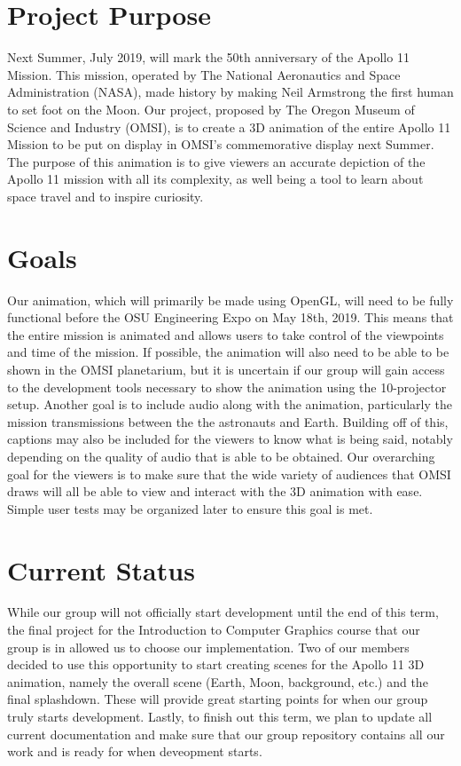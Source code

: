 \documentclass[onecolumn, draftclsnofoot,10pt, compsoc]{IEEEtran}
\begin{document}
\clearpage


\section{Project Purpose}
Next Summer, July 2019, will mark the 50th anniversary of the Apollo 11 Mission. This mission, operated by The National Aeronautics and Space Administration (NASA), made history by making Neil Armstrong the first human to set foot on the Moon. Our project, proposed by The Oregon Museum of Science and Industry (OMSI), is to create a 3D animation of the entire Apollo 11 Mission to be put on display in OMSI's commemorative display next Summer. The purpose of this animation is to give viewers an accurate depiction of the Apollo 11 mission with all its complexity, as well being a tool to learn about space travel and to inspire curiosity. 

\section{Goals}
Our animation, which will primarily be made using OpenGL, will need to be fully functional before the OSU Engineering Expo on May 18th, 2019. This means that the entire mission is animated and allows users to take control of the viewpoints and time of the mission. If possible, the animation will also need to be able to be shown in the OMSI planetarium, but it is uncertain if our group will gain access to the development tools necessary to show the animation using the 10-projector setup. 
\newline
\newline
Another goal is to include audio along with the animation, particularly the mission transmissions between the the astronauts and Earth. Building off of this, captions may also be included for the viewers to know what is being said, notably depending on the quality of audio that is able to be obtained. Our overarching goal for the viewers is to make sure that the wide variety of audiences that OMSI draws will all be able to view and interact with the 3D animation with ease. Simple user tests may be organized later to ensure this goal is met. 


\section{Current Status}
While our group will not officially start development until the end of this term, the final project for the Introduction to Computer Graphics course that our group is in allowed us to choose our implementation. Two of our members decided to use this opportunity to start creating scenes for the Apollo 11 3D animation, namely the overall scene (Earth, Moon, background, etc.) and the final splashdown. These will provide great starting points for when our group truly starts development. Lastly, to finish out this term, we plan to update all current documentation and make sure that our group repository contains all our work and is ready for when deveopment starts. 
\end{document}
